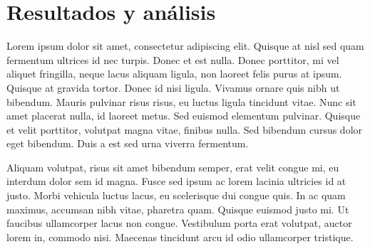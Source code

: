 \section{Resultados y análisis}

Lorem ipsum dolor sit amet, consectetur adipiscing elit. Quisque at nisl sed quam fermentum ultrices id nec turpis. Donec et est nulla. Donec porttitor, mi vel aliquet fringilla, neque lacus aliquam ligula, non laoreet felis purus at ipsum. Quisque at gravida tortor. Donec id nisi ligula. Vivamus ornare quis nibh ut bibendum. Mauris pulvinar risus risus, eu luctus ligula tincidunt vitae. Nunc sit amet placerat nulla, id laoreet metus. Sed euismod elementum pulvinar. Quisque et velit porttitor, volutpat magna vitae, finibus nulla. Sed bibendum cursus dolor eget bibendum. Duis a est sed urna viverra fermentum.

Aliquam volutpat, risus sit amet bibendum semper, erat velit congue mi, eu interdum dolor sem id magna. Fusce sed ipsum ac lorem lacinia ultricies id at justo. Morbi vehicula luctus lacus, eu scelerisque dui congue quis. In ac quam maximus, accumsan nibh vitae, pharetra quam. Quisque euismod justo mi. Ut faucibus ullamcorper lacus non congue. Vestibulum porta erat volutpat, auctor lorem in, commodo nisi. Maecenas tincidunt arcu id odio ullamcorper tristique.